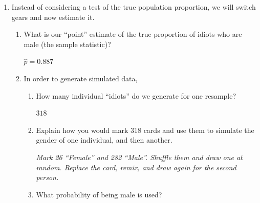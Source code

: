 \begin{enumerate}
\begin{enumerate}
\begin{key}
  {\it Extremely strong evidence, the p-value is less than 1 in
    1000. The null hypothesis of only half males is not 
    supported by these data. I conclude that there are more male idiots
  than female idiots.  } 
\end{key}


\end{enumerate}

\item Instead of considering a test of the true population proportion, we
  will switch gears and now estimate it.
  \begin{enumerate}
    \item What is our ``point'' estimate of the
      true proportion of idiots who are male (the sample statistic)?
\begin{students}
    \vspace{.4cm}    
\end{students}

\begin{key}
$\widehat{p} = 0.887$
\end{key}
    \item In order to generate simulated data,
      \begin{enumerate}
        \item How many individual ``idiots'' do we generate for one
          resample?
\begin{students}
    \vspace{.8cm}    
\end{students}

\begin{key} 
$318$
\end{key}
       \item Explain how you would mark 318 cards and use them to
         simulate the gender of one individual, and then another.
\begin{students}
    \vspace{2.5cm}    
\end{students}

\begin{key} 
  {\it Mark 26 ``Female'' and 282 ``Male''.  Shuffle them and draw one
  at random.  Replace the card, remix, and draw again for the second
  person.} 
\end{key}
       \item What probability of being male is used?
\begin{students}
    \vspace{.5cm}    
\end{students}


\end{enumerate}
\end{enumerate}
\end{enumerate}
